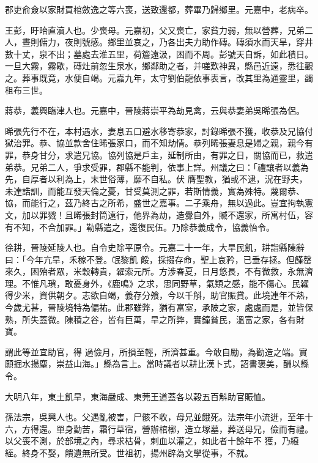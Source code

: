 \begin{pinyinscope}
 郡吏俞僉以家財買棺斂逸之等六喪，送致還都，葬畢乃歸鄉里。元嘉中，老病卒。



 王彭，盱眙直瀆人也。少喪母。元嘉初，父又喪亡，家貧力弱，無以營葬，兄弟二人，晝則傭力，夜則號感。鄉里並哀之，乃各出夫力助作磚。磚須水而天旱，穿井數十丈，泉不出；墓處去淮五里，荷簷遠汲，困而不周。彭號天自訴，如此積日。一旦大霧，霧歇，磚灶前忽生泉水，鄉鄰助之者，并嗟歎神異，縣邑近遠，悉往觀之。葬事既竟，水便自竭。元嘉九年，太守劉伯龍依事表言，改其里為通靈里，蠲租布三世。



 蔣恭，義興臨津人也。元嘉中，晉陵蔣崇平為劫見禽，云與恭妻弟吳晞張為侶。



 晞張先行不在，本村遇水，妻息五口避水移寄恭家，討錄晞張不獲，收恭及兄協付獄治罪。恭、協並款舍住晞張家口，而不知劫情。恭列晞張妻息是婦之親，親今有罪，恭身甘分，求遣兄協。協列協是戶主，延制所由，有罪之日，關協而已，救遣弟恭。兄弟二人，爭求受罪，郡縣不能判，依事上詳。州議之曰：「禮讓者以義為先，自厚者以利為上，末世俗薄，靡不自私。伏
 膺聖教，猶或不逮，況在野夫，未達誥訓，而能互發天倫之憂，甘受莫測之罪，若斯情義，實為殊特。蔑爾恭、協，而能行之，茲乃終古之所希，盛世之嘉事。二子乘舟，無以過此。豈宜拘執憲文，加以罪戮！且晞張封筒遠行，他界為劫，造釁自外，贓不還家，所寓村伍，容有不知，不合加罪。」勒縣遣之，還復民伍。乃除恭義成令，協義怡令。



 徐耕，晉陵延陵人也。自令史除平原令。元嘉二十一年，大旱民飢，耕詣縣陳辭曰：「今年亢旱，禾稼不登。氓黎飢
 餒，採掇存命，聖上哀矜，已垂存拯。但饉罄來久，困殆者眾，米穀轉貴，糴索元所。方涉春夏，日月悠長，不有微救，永無濟理。不惟凡瑣，敢憂身外，《鹿鳴》之求，思同野草，氣類之感，能不傷心。民糴得少米，資供朝夕。志欲自竭，義存分飧，今以千斛，助官賑貸。此境連年不熟，今歲尤甚，晉陵境特為偏祐。此郡雖弊，猶有富室，承陂之家，處處而是，並皆保熟，所失蓋微。陳積之谷，皆有巨萬，旱之所弊，實鐘貧民，溫富之家，各有財寶。



 謂此等並宜助官，得
 過儉月，所損至輕，所濟甚重。今敢自勵，為勸造之端。實願掘水揚塵，崇益山海。」縣為言上。當時議者以耕比漢卜式，詔書褒美，酬以縣令。



 大明八年，東土飢旱，東海嚴成、東莞王道蓋各以穀五百斛助官賑恤。



 孫法宗，吳興人也。父遇亂被害，尸骸不收，母兄並餓死。法宗年小流迸，至年十六，方得還。單身勤苦，霜行草宿，營辦棺槨，造立塚墓，葬送母兄，儉而有禮。以父喪不測，於部境之內，尋求枯骨，刺血以灌之，如此者十餘年不
 獲，乃縗絰。終身不娶，饋遺無所受。世祖初，揚州辟為文學從事，不就。




\end{pinyinscope}
